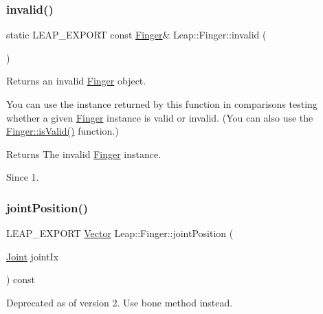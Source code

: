 \subsubsection{\texorpdfstring{invalid()}{invalid()}}
{\footnotesize\ttfamily static L\+E\+A\+P\+\_\+\+E\+X\+P\+O\+RT const \hyperlink{class_leap_1_1_finger}{Finger}\& Leap\+::\+Finger\+::invalid (\begin{DoxyParamCaption}{ }\end{DoxyParamCaption})\hspace{0.3cm}{\ttfamily [static]}}

Returns an invalid \hyperlink{class_leap_1_1_finger}{Finger} object.

You can use the instance returned by this function in comparisons testing whether a given \hyperlink{class_leap_1_1_finger}{Finger} instance is valid or invalid. (You can also use the \hyperlink{class_leap_1_1_pointable_afe50d02eb1b4f554a4089c329fda1a45}{Finger\+::is\+Valid()} function.)


\begin{DoxyCodeInclude}
\end{DoxyCodeInclude}


\begin{DoxyReturn}{Returns}
The invalid \hyperlink{class_leap_1_1_finger}{Finger} instance. 
\end{DoxyReturn}
\begin{DoxySince}{Since}
1. 
\end{DoxySince}
\mbox{\label{class_leap_1_1_finger_a8f50342f74888b3628ffb7aeadcfe0b5}} 
\subsubsection{\texorpdfstring{joint\+Position()}{jointPosition()}}
{\footnotesize\ttfamily L\+E\+A\+P\+\_\+\+E\+X\+P\+O\+RT \hyperlink{struct_leap_1_1_vector}{Vector} Leap\+::\+Finger\+::joint\+Position (\begin{DoxyParamCaption}\item[{\hyperlink{class_leap_1_1_finger_ac49e756a0440cb5b75a9ad7838f08137}{Joint}}]{joint\+Ix }\end{DoxyParamCaption}) const}

Deprecated as of version 2. Use \textquotesingle{}bone\textquotesingle{} method instead. \mbox{\label{class_leap_1_1_finger_aaccf83b863c7cdbf820ed991d4a8faa1}} 
